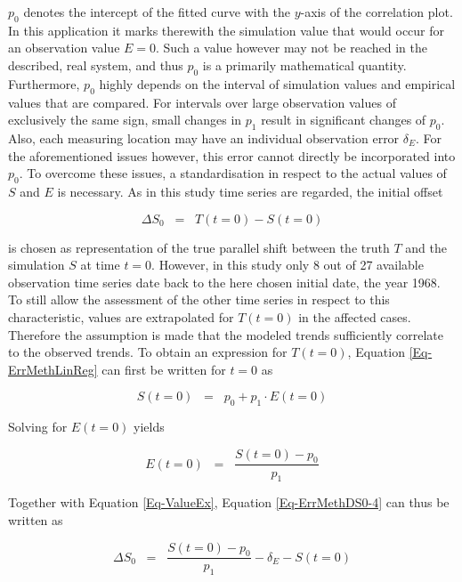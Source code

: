 $p_0$ denotes the intercept of the fitted curve with the $y$-axis of the correlation plot. In this application it marks therewith the simulation value that would occur for an observation value $E = 0$. Such a value however may not be reached in the described, real system, and thus $p_0$ is a primarily mathematical quantity. Furthermore, $p_0$ highly depends on the interval of simulation values and empirical values that are compared. For intervals over large observation values of exclusively the same sign, small changes in $p_1$ result in significant changes of $p_0$. Also, each measuring location may have an individual observation error $\delta_E$. For the aforementioned issues however, this error cannot directly be incorporated into $p_0$. To overcome these issues, a standardisation in respect to the actual values of $S$ and $E$ is necessary. As in this study time series are regarded, the initial offset

\begin{equation}
    \label{Eq-ErrMethDS0-1}
    \Delta S_0 \; \; = \; \; T(t\!=\!0) - S(t\!=\!0)
\end{equation}

\noindent is chosen as representation of the true parallel shift between the truth $T$ and the simulation $S$ at time $t\!=\!0$. However, in this study only 8 out of 27 available observation time series date back to the here chosen initial date, the year 1968. To still allow the assessment of the other time series in respect to this characteristic, values are extrapolated for $T(t\!=\!0)$ in the affected cases. Therefore the assumption is made that the modeled trends sufficiently correlate to the observed trends. To obtain an expression for $T(t\!=\!0)$, Equation \eqref{Eq-ErrMethLinReg} can first be written for $t\!=\!0$ as

\begin{equation}
    \label{Eq-ErrMethDS0-2}
    S(t\!=\!0) \; \; = \; \; p_0 + p_1 \cdot E(t\!=\!0)
\end{equation}

\noindent Solving for $E(t\!=\!0)$ yields

\begin{equation*}
    \label{Eq-ErrMethDS0-3}
    E(t\!=\!0) \; \; = \; \; \frac{S(t\!=\!0) - p_0}{p_1}
\end{equation*}

Together with Equation \eqref{Eq-ValueEx}, Equation \eqref{Eq-ErrMethDS0-4} can thus be written as

\begin{equation*}
    \label{Eq-ErrMethDS0-4}
    \Delta S_0 \; \; = \; \; \frac{S(t=0) - p_0}{p_1} - \delta_E - S(t\!=\!0)
\end{equation*}

